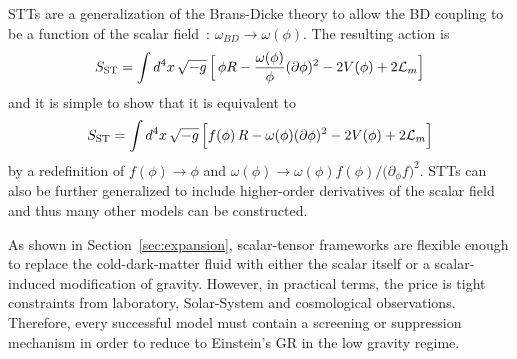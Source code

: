 STTs are a generalization of the Brans-Dicke theory to allow the BD coupling to be a function of the scalar field~\cite{Quiros:2019ktw}: $\omega_{BD} \rightarrow \omega(\phi)$. The resulting action is
\begin{equation}
    S_{\text{ST}} = \int d^{4}x\,\sqrt{-g}\,\Bigl[\,\phi R - \frac{\omega(\phi)}{\phi}(\partial\phi)^{2} - 2V(\phi) + 2\mathcal{L}_{m}\Bigr]
\end{equation}
and it is simple to show that it is equivalent to 
\begin{equation}
S_{\text{ST}} = \int d^{4}x\,\sqrt{-g}\,\Bigl[f(\phi)\,R - \omega(\phi)(\partial\phi)^{2} - 2V(\phi) + 2\mathcal{L}_{m}\Bigr]
\end{equation}
by a redefinition of $f(\phi) \rightarrow \phi$ and $\omega(\phi) \rightarrow  \omega(\phi)f(\phi)/\bigl(\partial_{\phi}f\bigr)^{2}$.
STTs can also be further generalized to include higher-order derivatives of the scalar field and thus many other models can be constructed. 

As shown in Section~\ref{sec:expansion}, scalar-tensor frameworks are flexible enough to replace the cold-dark-matter fluid with either the scalar itself or a scalar-induced modification of gravity. 
However, in practical terms, the price is tight constraints from laboratory, Solar-System and cosmological observations. Therefore, every successful model must contain a screening or suppression mechanism in order to reduce to Einstein's GR in the low gravity regime. 

